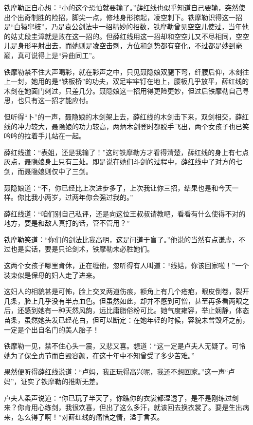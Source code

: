 \documentclass[12pt,oneside]{book}
\begin{document}
铁摩勒正自心想：``小的这个恐怕就要输了。''薛红线也似乎知道自己要输，突然使出个出奇制胜的险招，脚尖一点，修地身形掠起，凌空刺下。铁摩勒识得这一招是``白猿窜枝''，乃是袁公剑法中一招精妙的招数，铁摩勒曾见空空儿使过，当年他的姑丈段圭漳就是败在这一招的。但薛红线用这一招却和空空儿又不尽相同，空空儿是身形平射出去，而她则是凌空击刺，方位和剑势都有变化，不过都是妙到毫巅，真可说得上是``异曲同工''。

铁摩勒禁不住大声喝彩，就在彩声之中，只见聂隐娘双腿下弯，纤腰后仰，木剑往上一封，她用的是``铁板桥''的功夫，双足牢牢钉在地上，腰板几乎放平，薛红线的木剑在她面门刺过，只差几分。聂隐娘这一招用得更险更妙，但过后铁摩勒自己寻思，也只有这一招才能应付。

但听得``卜''的一声，聂隐娘的木剑架上去，薛红线的木剑击下来，双剑相交，薛红线的冲力较大，聂隐娘的功力较高，两炳木剑登时都脱手飞出，两个女孩子也已笑吟吟的拉着手儿站在一起。

薛红线道：``表姐，还是我输了！''这时铁摩勒方才看得清楚，薛红线的身上有七点灰点，聂隐娘身上只有三处。即是说在她们斗剑的过程中，薛红线中了对方的七剑，而聂隐娘则仅中了三剑。

聂隐娘道：``不，你已经比上次进步多了，上次我让你三招，结果也是和今天一样。你比我小两岁，过两年你会强过我的。''

薛红线道：``咱们别自己私评，还是向这位王叔叔请教吧，看看有什么使得不对的地方，要是和敌人真打的话，管不管用？''

铁摩勒笑道：``你们的剑法比我高明，这是问道于盲了。''他说的当然有点谦虚，不过也是实话，要是只论剑术，铁摩勒未必胜她们。

这两个女孩子哪里肯休，正在缠他，忽听得有人叫道：``线姑，你该回家啦！''一个装束似是保母的妇人走了进来。

这妇人的相貌甚是可怖，脸上交叉两道伤痕，额角上有几个疮疤，眼皮倒卷，裂开几条，脸上几乎没有半点血色。但虽然如此，却并不感到可憎，甚至再多看两眼之后，还感到她有一种天然风韵，远比庸脂俗粉可比。她气度雍容，举止娴静，体态苗条，虽然她头发已经花白，但可以断定：在她年轻的时候，容貌未曾毁坏之前，一定是个出自名门的美人胎子！

铁摩勒一见，禁不住心头一震，又悲又喜。想道：``这一定是卢夫人无疑了。可怜她为了保全贞节而自毁容颜，在这十年中不知曾受了多少苦难。''

果然便听得薛红线说道：``卢妈，我正玩得高兴呢，我还不想回家。''这一声``卢妈''，证实了铁摩勒的推断无差。

卢夫人柔声说道：``你已玩了半天了，你瞧你的衣裳都湿透了，是不是刚练过剑来？你肯用心练剑，我很欢喜，但出了这么多汗，就该回去换衣裳了。要是生出病来，怎么得了啊！''对薛红线的痛惜之情，溢于言表。
\end{document}

